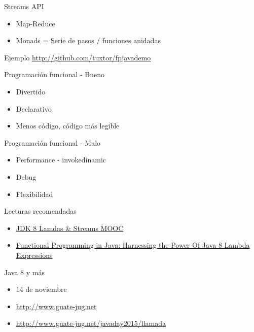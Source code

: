 \documentclass{beamer}
\begin{document}
\begin{frame}{Streams API}
	\begin{itemize}
	\item Map-Reduce
	\item Monads = Serie de pasos / funciones anidadas
	\end{itemize}
	
\end{frame}

\begin{frame}{Ejemplo}
	\href{http://github.com/tuxtor/fpjavademo}{http://github.com/tuxtor/fpjavademo}
\end{frame}

\begin{frame}{Programación funcional - Bueno}
	\begin{itemize}
	\item Divertido
	\item Declarativo
	\item Menos código, código más legible
	\end{itemize}
\end{frame}

\begin{frame}{Programación funcional - Malo}
	\begin{itemize}
	\item Performance - invokedinamic
	\item Debug
	\item Flexibilidad
	\end{itemize}
\end{frame}

\begin{frame}{Lecturas recomendadas}
	\begin{itemize}
	\item  \href{https://www.youtube.com/playlist?list=PLMod1hYiIvSZL1xclvHcsV2dMiminf19x}{JDK 8 Lamdas \& Streams MOOC}
	\item  \href{http://www.amazon.com/Functional-Programming-Java-Harnessing-Expressions/dp/1937785467}{Functional Programming in Java: Harnessing the Power Of Java 8 Lambda Expressions}
	\end{itemize}
\end{frame}

\begin{frame}{Java 8 y más}
	\begin{itemize}
	\item 14 de noviembre
	\item \href{http://www.guate-jug.net}{http://www.guate-jug.net}
	\item \href{http://www.guate-jug.net/javaday2015/llamada}{http://www.guate-jug.net/javaday2015/llamada}
	\end{itemize}
\end{frame}
\end{document}
